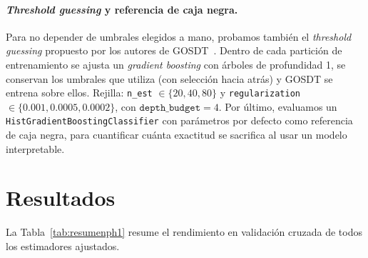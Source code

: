 \documentclass[a4paper,11pt]{article}
\begin{document}
\paragraph{\textit{Threshold guessing} y referencia de caja negra.} Para no depender de umbrales elegidos a mano, probamos también el \textit{threshold guessing} propuesto por los autores de GOSDT~\cite{mctavish2022}. Dentro de cada partición de entrenamiento se ajusta un \textit{gradient boosting} con árboles de profundidad 1, se conservan los umbrales que utiliza (con selección hacia atrás) y GOSDT se entrena sobre ellos. Rejilla: \texttt{n\_est} $\in \{20, 40, 80\}$ y \texttt{regularization} $\in \{0.001, 0.0005, 0.0002\}$, con $\texttt{depth\_budget}=4$. Por último, evaluamos un \texttt{HistGradientBoostingClassifier} con parámetros por defecto como referencia de caja negra, para cuantificar cuánta exactitud se sacrifica al usar un modelo interpretable.

\section{Resultados}

La Tabla~\ref{tab:resumenph1} resume el rendimiento en validación cruzada de todos los estimadores ajustados.
\end{document}
